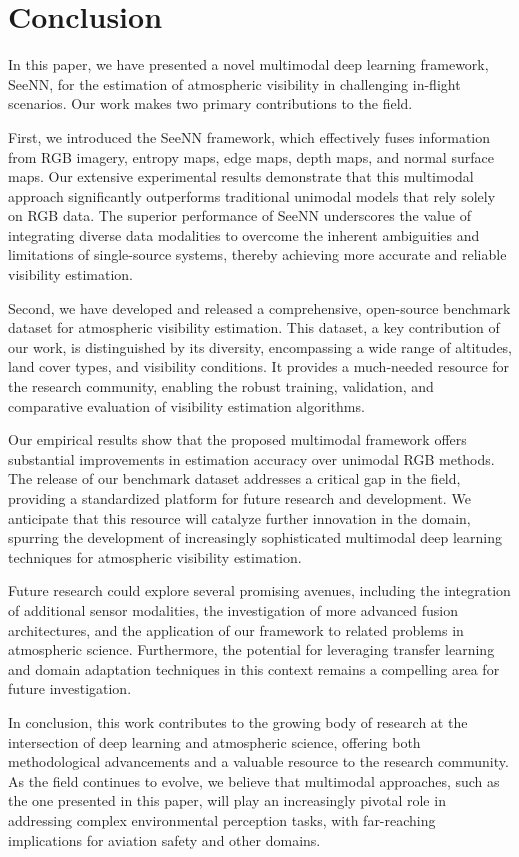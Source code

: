 \section{Conclusion}
\label{sec:conclusion}

In this paper, we have presented a novel multimodal deep learning framework, SeeNN, for the estimation of atmospheric visibility in challenging in-flight scenarios. Our work makes two primary contributions to the field.

First, we introduced the SeeNN framework, which effectively fuses information from RGB imagery, entropy maps, edge maps, depth maps, and normal surface maps. Our extensive experimental results demonstrate that this multimodal approach significantly outperforms traditional unimodal models that rely solely on RGB data. The superior performance of SeeNN underscores the value of integrating diverse data modalities to overcome the inherent ambiguities and limitations of single-source systems, thereby achieving more accurate and reliable visibility estimation.

Second, we have developed and released a comprehensive, open-source benchmark dataset for atmospheric visibility estimation. This dataset, a key contribution of our work, is distinguished by its diversity, encompassing a wide range of altitudes, land cover types, and visibility conditions. It provides a much-needed resource for the research community, enabling the robust training, validation, and comparative evaluation of visibility estimation algorithms.

Our empirical results show that the proposed multimodal framework offers substantial improvements in estimation accuracy over unimodal RGB methods. The release of our benchmark dataset addresses a critical gap in the field, providing a standardized platform for future research and development. We anticipate that this resource will catalyze further innovation in the domain, spurring the development of increasingly sophisticated multimodal deep learning techniques for atmospheric visibility estimation.

Future research could explore several promising avenues, including the integration of additional sensor modalities, the investigation of more advanced fusion architectures, and the application of our framework to related problems in atmospheric science. Furthermore, the potential for leveraging transfer learning and domain adaptation techniques in this context remains a compelling area for future investigation.

In conclusion, this work contributes to the growing body of research at the intersection of deep learning and atmospheric science, offering both methodological advancements and a valuable resource to the research community. As the field continues to evolve, we believe that multimodal approaches, such as the one presented in this paper, will play an increasingly pivotal role in addressing complex environmental perception tasks, with far-reaching implications for aviation safety and other domains.

